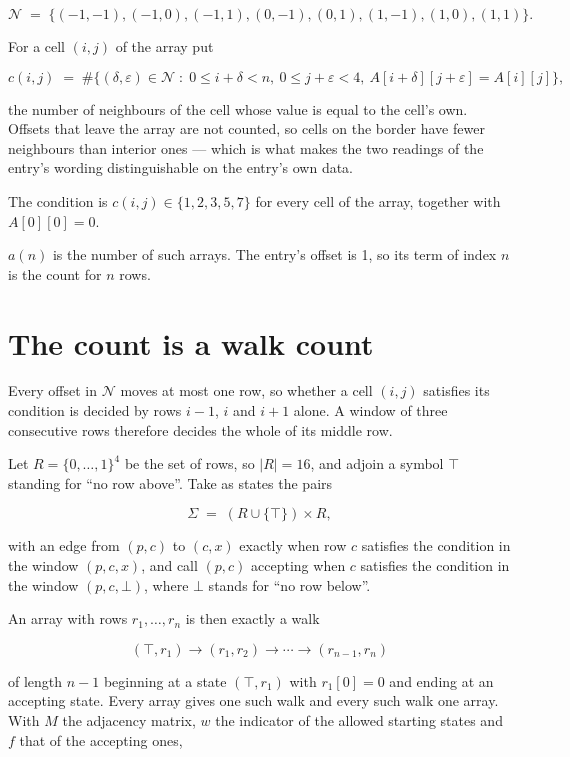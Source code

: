 \documentclass[11pt]{article}
\theoremstyle{definition}
\begin{document}
\[\mathcal{N} \;=\; \{(-1,-1), (-1,0), (-1,1), (0,-1), (0,1), (1,-1), (1,0), (1,1)\}.\]

For a cell $(i,j)$ of the array put

\[c(i,j) \;=\; \#\bigl\{(\delta,\varepsilon)\in\mathcal{N} \;:\; 0\le i+\delta<n,\ 0\le j+\varepsilon<4,\ A[i+\delta][j+\varepsilon] = A[i][j]\bigr\},\]

the number of neighbours of the cell whose value is equal to the cell's own. Offsets that leave the array are not counted, so cells on the border have fewer neighbours than interior ones --- which is what makes the two readings of the entry's wording distinguishable on the entry's own data.

The condition is $c(i,j) \in \{1, 2, 3, 5, 7\}$ for every cell of the array, together with $A[0][0]=0$.

$a(n)$ is the number of such arrays. The entry's offset is 1, so its term of index $n$ is the count for $n$ rows.

\section{The count is a walk count}

Every offset in $\mathcal{N}$ moves at most one row, so whether a cell $(i,j)$ satisfies its condition is decided by rows $i-1$, $i$ and $i+1$ alone. A window of three consecutive rows therefore decides the whole of its middle row.

Let $R = \{0,\dots,1\}^{4}$ be the set of rows, so $|R| = 16$, and adjoin a symbol $\top$ standing for ``no row above''. Take as states the pairs

\[\Sigma \;=\; (R \cup \{\top\}) \times R,\]

with an edge from $(p,c)$ to $(c,x)$ exactly when row $c$ satisfies the condition in the window $(p,c,x)$, and call $(p,c)$ accepting when $c$ satisfies the condition in the window $(p,c,\bot)$, where $\bot$ stands for ``no row below''.

An array with rows $r_1,\dots,r_n$ is then exactly a walk

\[(\top,r_1) \to (r_1,r_2) \to \cdots \to (r_{n-1},r_n)\]

of length $n-1$ beginning at a state $(\top,r_1)$ with $r_1[0]=0$ and ending at an accepting state. Every array gives one such walk and every such walk one array. With $M$ the adjacency matrix, $w$ the indicator of the allowed starting states and $f$ that of the accepting ones,
\end{document}
